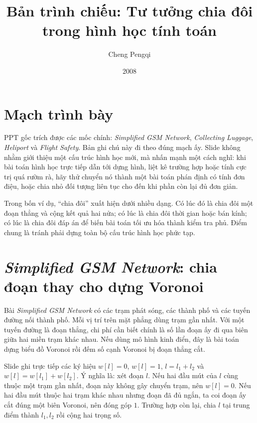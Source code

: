 \documentclass[11pt]{article}
\title{Bản trình chiếu: Tư tưởng chia đôi trong hình học tính toán}
\author{Cheng Pengqi}
\date{2008}
\begin{document}
\maketitle


\section{Mạch trình bày}

PPT gốc trích được các mốc chính: \textit{Simplified GSM Network},
\textit{Collecting Luggage}, \textit{Heliport} và \textit{Flight Safety}.
Bản ghi chú này đi theo đúng mạch ấy. Slide không nhằm giới thiệu một cấu
trúc hình học mới, mà nhấn mạnh một cách nghĩ: khi bài toán hình học trực
tiếp dẫn tới dựng hình, liệt kê trường hợp hoặc tính cực trị quá rườm rà, hãy
thử chuyển nó thành một bài toán phán định có tính đơn điệu, hoặc chia nhỏ
đối tượng liên tục cho đến khi phần còn lại đủ đơn giản.

Trong bốn ví dụ, ``chia đôi'' xuất hiện dưới nhiều dạng. Có lúc đó là chia
đôi một đoạn thẳng và cộng kết quả hai nửa; có lúc là chia đôi thời gian hoặc
bán kính; có lúc là chia đôi đáp án để biến bài toán tối ưu hóa thành kiểm
tra phủ. Điểm chung là tránh phải dựng toàn bộ cấu trúc hình học phức tạp.

\section{\textit{Simplified GSM Network}: chia đoạn thay cho dựng Voronoi}

Bài \textit{Simplified GSM Network} có các trạm phát sóng, các thành phố và
các tuyến đường nối thành phố. Mỗi vị trí trên mặt phẳng dùng trạm gần nhất.
Với một tuyến đường là đoạn thẳng, chi phí cần biết chính là số lần đoạn ấy
đi qua biên giữa hai miền trạm khác nhau. Nếu dùng mô hình kinh điển, đây là
bài toán dựng biểu đồ Voronoi rồi đếm số cạnh Voronoi bị đoạn thẳng cắt.

Slide ghi trực tiếp các ký hiệu \(w[l]=0\), \(w[l]=1\), \(l=l_1+l_2\) và
\(w[l]=w[l_1]+w[l_2]\). Ý nghĩa là: xét đoạn \(l\). Nếu hai đầu mút của
\(l\) cùng thuộc một trạm gần nhất, đoạn này không gây chuyển trạm, nên
\(w[l]=0\). Nếu hai đầu mút thuộc hai trạm khác nhau nhưng đoạn đã đủ ngắn,
ta coi đoạn ấy cắt đúng một biên Voronoi, nên đóng góp \(1\). Trường hợp còn
lại, chia \(l\) tại trung điểm thành \(l_1,l_2\) rồi cộng hai trọng số.
\end{document}
